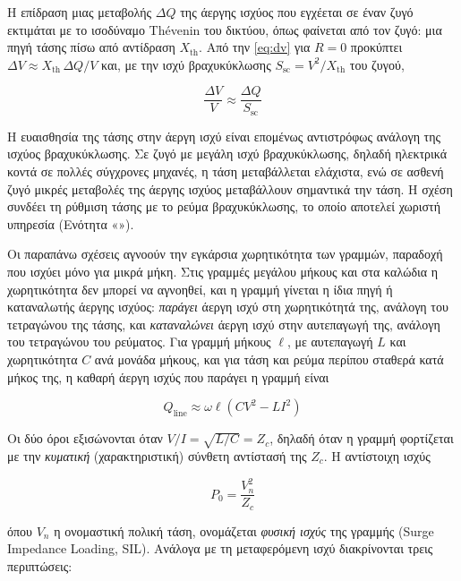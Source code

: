 Η επίδραση μιας μεταβολής $\Delta Q$ της άεργης ισχύος που εγχέεται σε έναν ζυγό εκτιμάται με
το ισοδύναμο Thévenin του δικτύου, όπως φαίνεται από τον ζυγό: μια πηγή τάσης πίσω από
αντίδραση $X_{\mathrm{th}}$. Από την \eqref{eq:dv} για $R = 0$ προκύπτει
$\Delta V \approx X_{\mathrm{th}}\,\Delta Q / V$ και, με την ισχύ βραχυκύκλωσης
$S_{\mathrm{sc}} = V^2 / X_{\mathrm{th}}$ του ζυγού,

\begin{equation}
\frac{\Delta V}{V} \approx \frac{\Delta Q}{S_{\mathrm{sc}}}
\label{eq:dv-ssc}
\end{equation}

Η ευαισθησία της τάσης στην άεργη ισχύ είναι επομένως αντιστρόφως ανάλογη της ισχύος
βραχυκύκλωσης. Σε ζυγό με μεγάλη ισχύ βραχυκύκλωσης, δηλαδή ηλεκτρικά κοντά σε πολλές
σύγχρονες μηχανές, η τάση μεταβάλλεται ελάχιστα, ενώ σε ασθενή ζυγό μικρές μεταβολές της
άεργης ισχύος μεταβάλλουν σημαντικά την τάση. Η σχέση συνδέει τη ρύθμιση τάσης με το ρεύμα
βραχυκύκλωσης, το οποίο αποτελεί χωριστή υπηρεσία (Ενότητα «»).

Οι παραπάνω σχέσεις αγνοούν την εγκάρσια χωρητικότητα των γραμμών, παραδοχή που ισχύει μόνο
για μικρά μήκη. Στις γραμμές μεγάλου μήκους και στα καλώδια η χωρητικότητα δεν μπορεί να
αγνοηθεί, και η γραμμή γίνεται η ίδια πηγή ή καταναλωτής άεργης ισχύος: \emph{παράγει} άεργη
ισχύ στη χωρητικότητά της, ανάλογη του τετραγώνου της τάσης, και \emph{καταναλώνει} άεργη ισχύ
στην αυτεπαγωγή της, ανάλογη του τετραγώνου του ρεύματος. Για γραμμή μήκους $\ell$, με
αυτεπαγωγή $L$ και χωρητικότητα $C$ ανά μονάδα μήκους, και για τάση και ρεύμα περίπου σταθερά
κατά μήκος της, η καθαρή άεργη ισχύς που παράγει η γραμμή είναι

\begin{equation}
Q_{\mathrm{line}} \approx \omega \ell \left( C V^2 - L I^2 \right)
\label{eq:qline}
\end{equation}

Οι δύο όροι εξισώνονται όταν $V/I = \sqrt{L/C} = Z_c$, δηλαδή όταν η γραμμή φορτίζεται με την
\emph{κυματική} (χαρακτηριστική) σύνθετη αντίστασή της $Z_c$. Η αντίστοιχη ισχύς

\begin{equation}
P_0 = \frac{V_n^2}{Z_c}
\label{eq:sil}
\end{equation}

όπου $V_n$ η ονομαστική πολική τάση, ονομάζεται \emph{φυσική ισχύς} της γραμμής (Surge
Impedance Loading, SIL). Ανάλογα με τη μεταφερόμενη ισχύ διακρίνονται τρεις περιπτώσεις:

